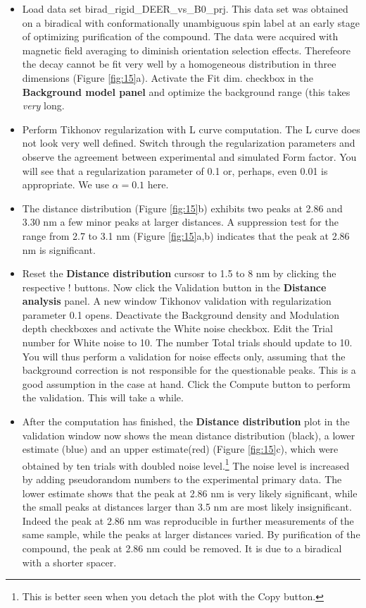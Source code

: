 \documentclass[11pt,a4paper]{article}
\begin{document}
\begin{itemize}
	\item Load data set {\ttfamily birad\_rigid\_DEER\_vs\_B0\_prj}. This data set was obtained on a biradical with conformationally unambiguous spin label \cite{jeschke2010} at an early stage of optimizing purification of the compound. The data were acquired with magnetic field averaging to diminish orientation selection effects. Therefeore the decay cannot be fit very well by a homogeneous distribution in three dimensions (Figure \ref{fig:15}a). Activate the {\ttfamily Fit dim.} checkbox in the {\ttfamily \bf Background model panel} and optimize the background range (this takes \emph{very} long.
	\item Perform Tikhonov regularization with L curve computation. The L curve does not look very well defined. Switch through the regularization parameters and observe the agreement between experimental and simulated {\ttfamily Form factor}. You will see that a regularization parameter of 0.1 or, perhaps, even 0.01 is appropriate. We use $\alpha = 0.1$ here.
	\item The distance distribution (Figure \ref{fig:15}b) exhibits two peaks at 2.86 and 3.30 nm a few minor peaks at larger distances.	A suppression test for the range from 2.7 to 3.1 nm (Figure \ref{fig:15}a,b) indicates that the peak at 2.86 nm is significant.
	\item Reset the {\ttfamily \bf Distance distribution} cursosr to 1.5 to 8 nm by clicking the respective {\ttfamily !} buttons. Now click the {\ttfamily Validation} button in the {\ttfamily \bf Distance analysis} panel. A new window {\ttfamily Tikhonov validation with regularization parameter 0.1} opens. Deactivate the {\ttfamily Background density} and {\ttfamily Modulation depth} checkboxes and activate the {\ttfamily White noise} checkbox. Edit the {\ttfamily Trial number} for {\ttfamily White noise} to 10. The number {\ttfamily Total trials} should update to 10. You will thus perform a validation for noise effects only, assuming that the background correction is not responsible for the questionable peaks. This is a good assumption in the case at hand. Click the {\ttfamily Compute} button to perform the validation. This will take a while.
	\item After the computation has finished, the {\ttfamily \bf Distance distribution} plot in the validation window now shows the mean distance distribution (black), a lower estimate (blue) and an upper estimate(red) (Figure \ref{fig:15}c), which were obtained by ten trials with doubled noise level.\footnote{This is better seen when you detach the plot with the {\ttfamily Copy} button.} The noise level is increased by adding pseudorandom numbers to the experimental primary data. The lower estimate shows that the peak at 2.86 nm is very likely significant, while the small peaks at distances larger than 3.5 nm are most likely insignificant. Indeed the peak at 2.86 nm was reproducible in further measurements of the same sample, while the peaks at larger distances varied. By purification of the compound, the peak at 2.86 nm could be removed. It is due to a biradical with a shorter spacer.

\end{itemize}
\end{document}

